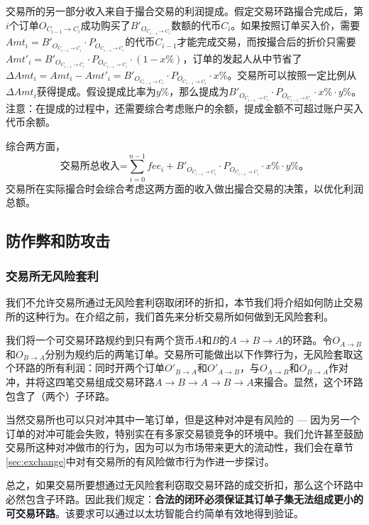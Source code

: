 \documentclass[UTF8,nofonts]{ctexart}
\begin{document}
交易所的另一部分收入来自于撮合交易的利润提成。假定交易环路撮合完成后，第$i$个订单$O_{C_{i-1}\rightarrow C_{i}}$成功购买了$B'_{O_{C_{i-1}\rightarrow C_{i}}}$数额的代币$C_{i}$。如果按照订单买入价，需要$Amt_{i}=B'_{O_{C_{i-1}\rightarrow C_{i}}}\cdot P_{O_{C_{i-1}\rightarrow C_{i}}}$的代币$C_{i-1}$才能完成交易，而按撮合后的折价只需要$Amt'_{i}=B'_{O_{C_{i-1}\rightarrow C_{i}}}\cdot P_{O_{C_{i-1}\rightarrow C_{i}}} \cdot (1-x\%)$，订单的发起人从中节省了$\Delta Amt_{i}=Amt_{i}-Amt'_{i}=B'_{O_{C_{i-1}\rightarrow C_{i}}}\cdot P_{O_{C_{i-1}\rightarrow C_{i}}} \cdot x\%$。交易所可以按照一定比例从$\Delta Amt_{i}$获得提成。假设提成比率为$y\%$，那么提成为$B'_{O_{C_{i-1}\rightarrow C_{i}}}\cdot P_{O_{C_{i-1}\rightarrow C_{i}}} \cdot x\% \cdot y\%$。注意：在提成的过程中，还需要综合考虑账户的余额，提成金额不可超过账户买入代币余额。

综合两方面，
$$
\text{交易所总收入=}\sum^{n-1}_{i=0}fee_{i} + B'_{O_{C_{i-1}\rightarrow C_{i}}}\cdot P_{O_{C_{i-1}\rightarrow C_{i}}} \cdot x\% \cdot y\%\text{。}
$$
交易所在实际撮合时会综合考虑这两方面的收入做出撮合交易的决策，以优化利润总额。

\subsection{防作弊和防攻击}

\subsubsection{交易所无风险套利}
我们不允许交易所通过无风险套利窃取闭环的折扣，本节我们将介绍如何防止交易所的这种行为。在介绍之前，我们首先来分析交易所如何做到无风险套利。

我们将一个可交易环路规约到只有两个货币$A$和$B$的$A\rightarrow B\rightarrow A$的环路。令$O_{A\rightarrow B}$和$O_{B\rightarrow A}$分别为规约后的两笔订单。交易所可能做出以下作弊行为，无风险套取这个环路的所有利润：同时开两个订单$O'_{ B\rightarrow A}$和$O'_{ A\rightarrow B}$，与$O_{A\rightarrow B}$和$O_{B\rightarrow A}$作对冲，并将这四笔交易组成交易环路$A\rightarrow B\rightarrow A\rightarrow B\rightarrow A$来撮合。显然，这个环路包含了（两个）子环路。

当然交易所也可以只对冲其中一笔订单，但是这种对冲是有风险的 --- 因为另一个订单的对冲可能会失败，特别实在有多家交易锁竞争的环境中。我们允许甚至鼓励交易所这种对冲做市的行为，因为可以为市场带来更大的流动性，我们会在章节\ref{sec:exchange}中对有交易所的有风险做市行为作进一步探讨。

总之，如果交易所要想通过无风险套利窃取交易环路的成交折扣，那么这个环路中必然包含子环路。因此我们规定：{\bfseries 合法的闭环必须保证其订单子集无法组成更小的可交易环路}。该要求可以通过以太坊智能合约简单有效地得到验证。
\end{document}
